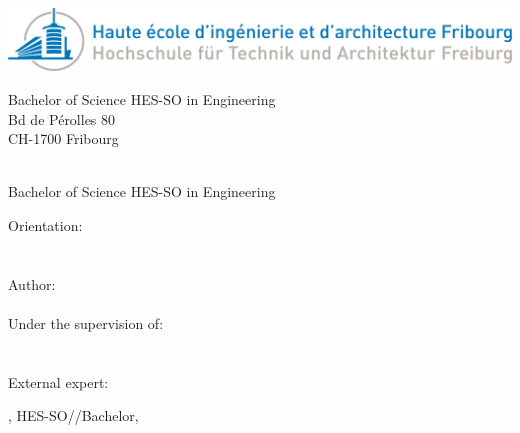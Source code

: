 
\begin{titlepage}
{\selectfont
	\begin{flushright}
		\begin{flushright}
		    \includegraphics[width=1\textwidth]{img/logo_heia-fr.png}
		\end{flushright}
		\begin{flushright}
			\footnotesize
			Bachelor of Science HES-SO in Engineering \\
			Bd de Pérolles 80 \\
			CH-1700 Fribourg
		\end{flushright}
		~\\[0.5cm]
		
		{
		\Huge Bachelor of Science HES-SO in Engineering\\[0.5cm]
		}
		
		{
		\LARGE Orientation: \Orientation\\[0.5cm]
		~\\[1cm]
		}
		{
			\Huge
			\ThesisTitle \\[1.5cm]
		}
		{
			\large
			Author:\\[-0.3cm]
			\Huge \Author \\[0.8cm]
		}
		{
			\large
			Under the supervision of: \\
			\Advisor \\
			\AdvisorResearchUnit \\[0.5cm]
		}
		{
			\large
			External expert: \\
			\Expert
		}
		\vfill
		
		{\large \Place, HES-SO//Bachelor, \Date}
		
	\end{flushright}
}
\restoregeometry
\end{titlepage}



